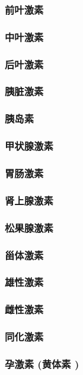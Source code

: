 \documentclass[UTF8]{../../ApplicationUniverse}
\begin{document}
        \subsubsection{前叶激素}
        \subsubsection{中叶激素}
        \subsubsection{后叶激素}
    \subsubsection{胰脏激素}
        \subsubsection{胰岛素}
    \subsubsection{甲状腺激素}
    \subsubsection{胃肠激素}
    \subsubsection{肾上腺激素}
    \subsubsection{松果腺激素}
    \subsubsection{甾体激素}
        \subsubsection{雄性激素}
        \subsubsection{雌性激素}
        \subsubsection{同化激素}
        \subsubsection{孕激素 (黄体素 )}
\end{document}
